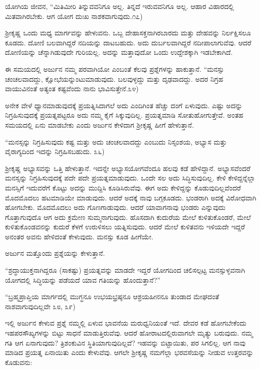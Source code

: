 ಯೋಗಿಯ ಜೀವನ, “ಮಿತಿಮೀರಿ ತಿನ್ನುವವನಿಗೂ ಅಲ್ಲ. ತಿನ್ನದೆ ಇರುವವನಿಗೂ ಅಲ್ಲ. ಆಹಾರ ವಿಹಾರದಲ್ಲಿ ಮಿತವಾಗಿರಬೇಕು. ಆಗ ಯೋಗ ದುಃಖ ನಾಶಕವಾಗುವುದು.೧೭)

ಶ‍್ರೀಕೃಷ್ಣ ಒಂದು ಮಧ್ಯ ಮಾರ್ಗವನ್ನು ಹೇಳುವನು. ಒಬ್ಬ ದೇಹಾಸಕ್ತನಾಗಿರಬಾರದು ಮತ್ತು ದೇಹವನ್ನು ನಿರ್ಲಕ್ಷಿಸಲೂ ಕೂಡದು. ದೋಣಿ ಬಲವಾಗಿದ್ದರೆ ನದಿಯನ್ನು ದಾಟಬಹುದು. ಅದು ದುರ್ಬಲವಾಗಿದ್ದರೆ ನದೀಪಾಲಾಗುವೆವು. ಆದರೆ ದೋಣಿಯನ್ನು ಚೆನ್ನಾಗಿಡುವುದೇ ಗುರಿಯಲ್ಲ. ಅದನ್ನು ಮತ್ತಾವುದೋ ಒಂದು ಉದ್ದೇಶಕ್ಕಾಗಿ ಇಡಬೇಕಾಗಿದೆ.

ಈ ಸಮಯದಲ್ಲಿ ಅರ್ಜುನ ನಮ್ಮ ಪರವಾಗಿಯೋ ಎಂಬಂತೆ ಕೆಲವು ಪ್ರಶ್ನೆಗಳನ್ನು ಹಾಕುತ್ತಾನೆ. “ಮನಸ್ಸು ಚಂಚಲವಾದದ್ದು, ಕ್ಷೋಭೆಯನ್ನುಂಟುಮಾಡುವುದು. ಬಲವುಳ್ಳದ್ದು ಮತ್ತು ದೃಢವಾದದ್ದು. ಅದರ ನಿಗ್ರಹ ವಾಯುವಿನಂತೆ ಅತ್ಯಂತ ಕಷ್ಟವೆಂದು ನಾನು ಭಾವಿಸುತ್ತೇನೆ.೩೪)

ಅನೇಕ ವೇಳೆ ಧ್ಯಾನಮಾಡುವುದಕ್ಕೆ ಪ್ರಯತ್ನಿಸಿದಾಗಲೆ ಅದು ಎಂದಿಗಿಂತ ಹೆಚ್ಚು ದಂಗೆ ಏಳುವುದು. ಎಷ್ಟು ಅದನ್ನು ನಿಗ್ರಹಿಸುವುದಕ್ಕೆ ಪ್ರಯತ್ನಪಟ್ಟರೂ ಅದು ನಮ್ಮ ಕೈಗೆ ಸಿಕ್ಕುವುದಿಲ್ಲ. ಪ್ರಯತ್ನ\-ಮಾಡಿ ಸೋತುಹೋಗುತ್ತೇವೆ. ಅಂತಹ ಸಮಯದಲ್ಲಿ ಏನು ಮಾಡಬೇಕು ಎಂದು ಅರ್ಜುನ ಕೇಳಿದಾಗ ಶ‍್ರೀಕೃಷ್ಣ ಹೀಗೆ ಹೇಳುತ್ತಾನೆ.

\newpage

“ಮನಸ್ಸನ್ನು ನಿಗ್ರಹಿಸುವುದು ಕಷ್ಟ ಮತ್ತು ಅದು ಚಂಚಲವಾದದ್ದು ಎಂಬುದು ನಿಸ್ಸಂಶಯ, ಅಭ್ಯಾಸ ಮತ್ತು ವೈರಾಗ್ಯದಿಂದ ಇದನ್ನು ನಿಗ್ರಹಿಸಬಹುದು. ೩೬)

ಶ‍್ರೀಕೃಷ್ಣ ಅಭ್ಯಾಸವನ್ನು ಒತ್ತಿ ಹೇಳುತ್ತಾನೆ. ಇದನ್ನೇ ಅಭ್ಯಾಸಯೋಗವೆಂದೂ ಹಲವು ಕಡೆ ಹೇಳಿದ್ದಾನೆ. ಅಭ್ಯಾಸವೆಂದರೆ ಮನಸ್ಸನ್ನು ನಿಗ್ರಹಿಸುವುದಕ್ಕೆ ಪದೇ ಪದೇ ಪ್ರಯತ್ನಮಾಡುವುದು. ಒಂದೇ ಸಲ ಅದು ಸಿದ್ಧಿಸುವುದಿಲ್ಲ. ಕೇಳಿ ಕೇಳಿದ್ದನ್ನೆಲ್ಲಾ ಮನಸ್ಸಿಗೆ ಇದುವರೆಗೆ ಕೊಟ್ಟು ಅದನ್ನು ಮುದ್ದಿಸಿ ಕೂಡಿಸಿರುವೆವು. ಈಗ ಅದು ಕೇಳಿದ್ದನ್ನು ಕೊಡುವುದಿಲ್ಲವೆಂದರೆ ಮೊದಮೊದಲು ಹಟಮಾಡಿಯೇ ಮಾಡುವುದು. ಆದರೆ ಅದಕ್ಕೆ ನಾವು ಬಗ್ಗಕೂಡದು. ಭಂಡರಾಗಿ ಅದಕ್ಕೆ ವಿರೋಧವಾಗಿ ಹೋಗಬೇಕು. ಮೊದಮೊದಲು ಅದು ಗೊಣಗಾಡುವುದು. ಆದರೆ ಯಾವಾಗ\break ನಾವು ಭಂಡರು ಎನ್ನುವುದು ಗೊತ್ತಾಗುವುದೊ ಆಗ ಅದು ಕ್ರಮೇಣ ಸುಮ್ಮನಾಗುವುದು. ಹೊಸದಾಗಿ ಕುದುರೆಯ ಮೇಲೆ ಕುಳಿತುಕೊಂಡರೆ, ಮೇಲೆ ಕುಳಿತುಕೊಂಡವನನ್ನು ಕುದುರೆ ಕೆಳಗೆ ಉರುಳಿಸಲು ಯತ್ನಿಸುವುದು. ಆದರೆ ಮೇಲೆ ಕುಳಿತವನು ಇಳಿಯದೇ ಇದ್ದರೆ ಅನಂತರ ಅವನು ಹೇಳಿದಂತೆ ಕೇಳುವುದು. ಮನಸ್ಸು ಕೂಡ ಹೀಗೆಯೇ.

ಅರ್ಜುನ ಮತ್ತೊಂದು ಪ್ರಶ್ನೆಯನ್ನು ಕೇಳುತ್ತಾನೆ.

“ಶ್ರದ್ಧಾಯುಕ್ತನಾಗಿದ್ದರೂ (ಸಾಕಷ್ಟು) ಪ್ರಯತ್ನವನ್ನು ಮಾಡದೇ ಇದ್ದರೆ ಯೋಗದಿಂದ ಚಲಿಸಲ್ಪಟ್ಟ ಮನಸ್ಸುಳ್ಳವನಾಗಿ ಯೋಗದಲ್ಲಿ ಸಿದ್ಧಿಯನ್ನು ಪಡೆಯದೆ ಯಾವ ಗತಿಯನ್ನು ಹೊಂದುತ್ತಾನೆ?”

“ಬ್ರಹ್ಮಪ್ರಾಪ್ತಿಯ ಮಾರ್ಗದಲ್ಲಿ ಮುಗ್ಧನೂ ಉಭಯಭ್ರಷ್ಠನೂ ಆಶ್ರಯಹೀನನೂ ತುಂಡಾದ ಮೇಘದಂತೆ ನಾಶವಾಗುವುದಿಲ್ಲವೇ ೩೮, ೩೯)

ಇಲ್ಲಿ ಅರ್ಜುನ ಕೇಳುವ ಪ್ರಶ್ನೆ ನಮ್ಮಲ್ಲಿ ಏಳುವ ಭಾವನೆಯ ಮರುಧ್ವನಿಯಂತೆ ಇದೆ. ದೇವರ ಕಡೆ ಹೋಗಬೇಕೆಂದು ಇಹಪರಸೌಖ್ಯಗಳನ್ನು ಬಿಟ್ಟು ಸಾಧನೆ ಮಾಡುತ್ತಿರುವೆವು. ಆದರೆ ಹೋರಾಟದಲ್ಲಿರುವಾಗಲೇ ಮೃತ್ಯು ಬರುವುದು. ನಮ್ಮ ಗತಿ ಆಗ ಏನಾಗುವುದು? ತ್ರಿಶಂಕುವಿನ ಸ್ಥಿತಿಯಾಗುವುದಿಲ್ಲವೆ? ಇಹವನ್ನು ಬಿಟ್ಟಾಯಿತು, ಪರ ಸಿಗಲಿಲ್ಲ. ಆಗ ನಾವು ಮಾಡಿದ ಪ್ರಯತ್ನ ಏನಾಯಿತು ಎಂದು ಕೇಳುವೆವು. ಆಗಲೇ ಶ‍್ರೀಕೃಷ್ಣ ನಮಗೆಲ್ಲಾ ಭರವಸೆಯನ್ನು ನೀಡುವ ಉತ್ತರವನ್ನು ಕೊಡುವನು:

